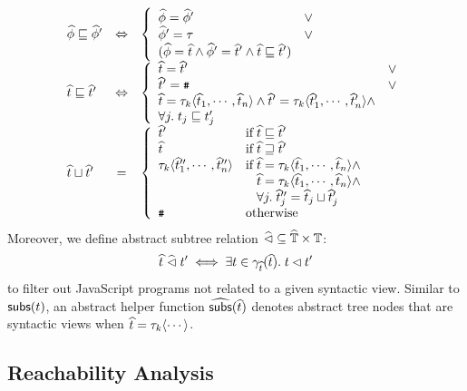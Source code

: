 \[
  \begin{array}{lcl}
    \anode \order \anode' &\Leftrightarrow& \left\{
      \begin{array}{ll}
        \anode = \anode' &\vee\\

        \anode' = \ty &\vee\\

        (\anode = \atree \wedge \anode' = \atree' \wedge \atree \order
        \atree')\\
      \end{array}
    \right.\\

    \atree \order \atree' &\Leftrightarrow& \left\{
      \begin{array}{ll}
        \atree = \atree' &\vee\\

        \atree' = \treetop &\vee\\

        \begin{array}{@{}l@{}}
          \atree = \ty_k \langle \atree_1, \cdots, \atree_n \rangle \wedge
          \atree' = \ty_k \langle \atree'_1, \cdots, \atree'_n \rangle \wedge\\
          \forall j. \; \tree_j \order \tree'_j\\
        \end{array}\\
      \end{array}
    \right.\\

    \atree \join \atree' &=& \left\{
      \begin{array}{ll}
        \atree' & \text{if} \; \atree \order \atree'\\

        \atree & \text{if} \; \atree \revorder \atree'\\

        \ty_k \langle \atree''_1, \cdots, \atree''_n \rangle &
        \text{if} \; \atree = \ty_k \langle \atree_1, \cdots, \atree_n \rangle
        \wedge\\&
        \phantom{\text{if} \;} \atree = \ty_k \langle \atree_1, \cdots, \atree_n
        \rangle \wedge\\&
        \phantom{\text{if} \;} \forall j. \; \atree''_j = \atree_j
        \join \atree'_j\\
        \treetop & \text{otherwise}\\
      \end{array}
    \right.\\
  \end{array}
\]
Moreover, we define abstract subtree relation $\widehat{\lhd} \subseteq \widehat{\mathbb{T}}
\times \mathbb{T}$:
\[
  \widehat{t} \; \widehat{\lhd} \; t' \iff \exists t \in \gamma_{\widehat{t}}(\widehat{t}). \;
  t \lhd t'
\]
to filter out JavaScript programs not related to a given syntactic view.
Similar to $\textsf{subs}(t)$, an abstract helper function $\widehat{\textsf{subs}}(\widehat{t})$
denotes abstract tree nodes that are syntactic views when $\widehat{t} = \tau_k
\langle \cdots \rangle$.

\subsection{Reachability Analysis}\label{sec:view}

\todo
